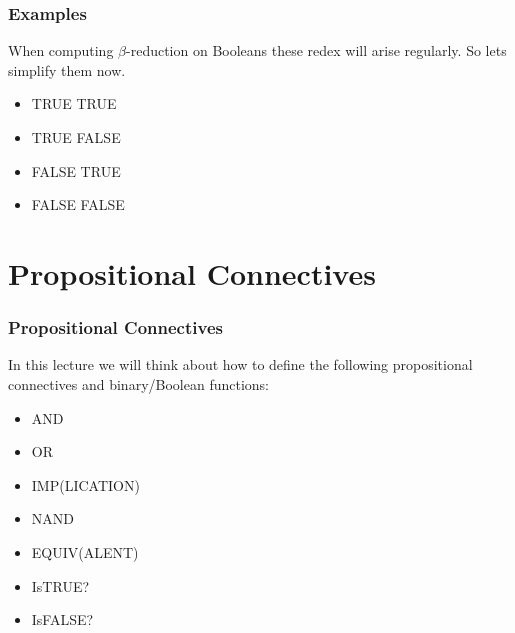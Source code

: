 \documentclass{beamer}
\begin{document}
\begin{frame}
	\frametitle{Examples}

	When computing $\beta$-reduction on Booleans these redex will arise regularly. So lets simplify them now.

	\vspace{0.5cm}

	\begin{itemize}
		\item[] TRUE TRUE \vspace{1cm}
		\item[] TRUE FALSE \vspace{1cm}
		\item[] FALSE TRUE \vspace{1cm}
		\item[] FALSE FALSE \vspace{1cm} 
	\end{itemize}
	
\end{frame}

\section{Propositional Connectives}

\begin{frame}
	\frametitle{Propositional Connectives}

	In this lecture we will think about how to define the following propositional connectives and binary/Boolean functions:

	\vspace{0.3cm}

	\begin{itemize}
		\item[] AND 
		\item[] OR 
		\item[] IMP(LICATION)
		\item[] NAND 
		\item[] EQUIV(ALENT) 
		\item[] IsTRUE?
		\item[] IsFALSE?
	\end{itemize}

	\vspace{3cm}

\end{frame}
\end{document}
